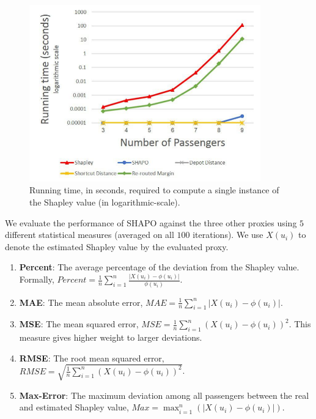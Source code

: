 \documentclass[sigconf]{aamas}
\begin{document}
\begin{figure}[hbpt]
\centering
\includegraphics[width=10cm]{runTime.pdf} 
\caption{Running time, in seconds, required to compute a single instance of the Shapley value (in logarithmic-scale).}
\label{fig:RunTimeGraph}
\end{figure}

We evaluate the performance of SHAPO against the three other proxies using $5$ different statistical measures (averaged on all $100$ iterations). We use $X(u_i)$ to denote the estimated Shapley value by the evaluated proxy.
\begin{enumerate}
    \item \textbf{Percent}: The average percentage of the deviation from the Shapley value. Formally, $Percent = \frac{1}{n}\sum_{i=1}^{n}\frac{|X(u_i) - \phi(u_i)|}{\phi(u_i)}$. 
    \item \textbf{MAE}: The mean absolute error, $MAE = \frac{1}{n}\sum_{i=1}^{n}|X(u_i) - \phi(u_i)|$. 
    \item \textbf{MSE}: The mean squared error, 
    $MSE = \frac{1}{n}\sum_{i=1}^{n}(X(u_i) - \phi(u_i))^2$. This measure gives higher weight to larger deviations.
    \item \textbf{RMSE}: The root mean squared error,  
    $RMSE = \sqrt{\frac{1}{n}\sum_{i=1}^{n}(X(u_i) - \phi(u_i))^2}$.
    \item \textbf{Max-Error}: The maximum deviation among all passengers between the real and estimated Shapley value,
    $Max = \max_{i=1}^{n}(|X(u_i) - \phi(u_i)|)$.
\end{enumerate}
\end{document}
